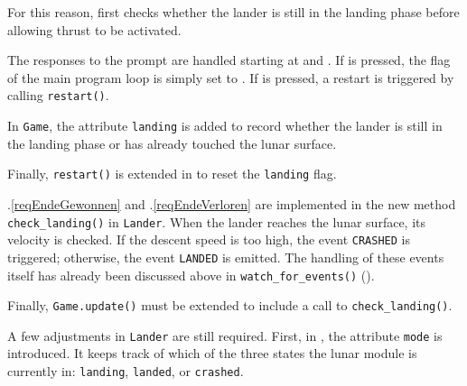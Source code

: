 For this reason,  first checks whether the lander is still in the landing phase before allowing thrust to be activated.

The responses to the prompt are handled starting at  and . If  is pressed, the flag of the main program loop is simply set to \false{}. If  is pressed, a restart is triggered by calling \texttt{restart()}.


In \texttt{Game}, the attribute \texttt{landing} is added to record whether the lander is still in the landing phase or has already touched the lunar surface.


Finally, \texttt{restart()} is extended in  to reset the \texttt{landing} flag.



.\ref{reqEndeGewonnen} and .\ref{reqEndeVerloren} are implemented in the new method \texttt{check\_land\-ing()} in \texttt{Lander}. When the lander reaches the lunar surface, its velocity is checked. If the descent speed is too high, the event \texttt{CRASHED} is triggered; otherwise, the event \texttt{LANDED} is emitted. The handling of these events itself has already been discussed above in \texttt{watch\_for\_events()} ().


Finally, \texttt{Game.update()} must be extended to include a call to \texttt{check\_landing()}.


A few adjustments in \texttt{Lander} are still required. First, in , the attribute \texttt{mode} is introduced. It keeps track of which of the three states the lunar module is currently in: \texttt{landing}, \texttt{landed}, or \texttt{crashed}.


